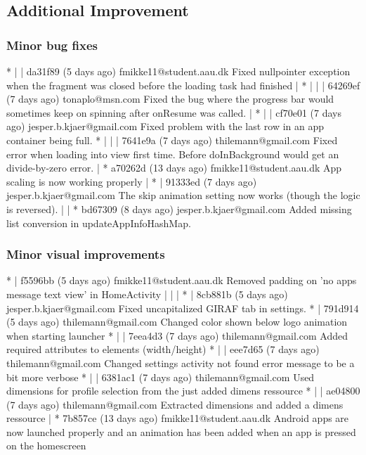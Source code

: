 \subsection{Additional Improvement}

\subsubsection{Minor bug fixes}
* | | da31f89 (5 days ago) fmikke11@student.aau.dk Fixed nullpointer exception when the fragment was closed before the loading task had finished
| * | | | 64269ef (7 days ago) tonaplo@msn.com Fixed the bug where the progress bar would sometimes keep on spinning after onResume was called.
| * | | cf70e01 (7 days ago) jesper.b.kjaer@gmail.com Fixed problem with the last row in an app container being full.
* | | | 7641e9a (7 days ago) thilemann@gmail.com Fixed error when loading into view first time. Before doInBackground would get an divide-by-zero error.
| * a70262d (13 days ago) fmikke11@student.aau.dk App scaling is now working properly
| * | 91333ed (7 days ago) jesper.b.kjaer@gmail.com The skip animation setting now works (though the logic is reversed).
| | * bd67309 (8 days ago) jesper.b.kjaer@gmail.com Added missing list conversion in updateAppInfoHashMap.

\subsubsection{Minor visual improvements}
* | f5596bb (5 days ago) fmikke11@student.aau.dk Removed padding on 'no apps message text view' in HomeActivity
| | | * | 8cb881b (5 days ago) jesper.b.kjaer@gmail.com Fixed uncapitalized GIRAF tab in settings.
* | 791d914 (5 days ago) thilemann@gmail.com Changed color shown below logo animation when starting launcher
* | | 7eea4d3 (7 days ago) thilemann@gmail.com Added required attributes to elements (width/height)
* | | eee7d65 (7 days ago) thilemann@gmail.com Changed settings activity not found error message to be a bit more verbose
* | | 6381ac1 (7 days ago) thilemann@gmail.com Used dimensions for profile selection from the just added dimens ressource
* | | ae04800 (7 days ago) thilemann@gmail.com Extracted dimensions and added a dimens ressource
| * 7b857ce (13 days ago) fmikke11@student.aau.dk Android apps are now launched properly and an animation has been added when an app is pressed on the homescreen